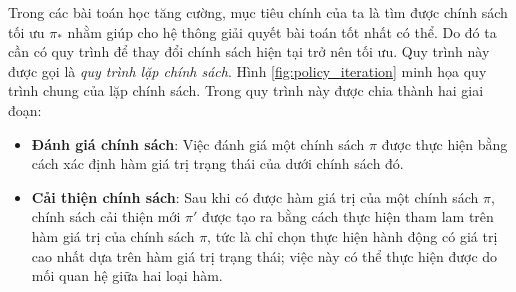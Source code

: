 	Trong các bài toán học tăng cường, mục tiêu chính của ta là tìm được chính sách tối ưu $\pi_{*}$ nhằm giúp cho hệ thông giải quyết bài toán tốt nhất có thể. Do đó ta cần có quy trình để thay đổi chính sách hiện tại trở nên tối ưu. Quy trình này được gọi là \textit{quy trình lặp chính sách}. Hình \ref{fig:policy_iteration} minh họa quy trình chung của lặp chính sách. Trong quy trình này được chia thành hai giai đoạn:
	\begin{itemize}
		\item \textbf{Đánh giá chính sách}: Việc đánh giá một chính sách $\pi$ được thực hiện bằng cách xác định hàm giá trị trạng thái của dưới chính sách đó.
		\item \textbf{Cải thiện chính sách}: Sau khi có được hàm giá trị của một chính sách $\pi$, chính sách cải thiện mới $\pi'$ được tạo ra bằng cách thực hiện tham lam trên hàm giá trị của chính sách $\pi$, tức là chỉ chọn thực hiện hành động có giá trị cao nhất dựa trên hàm giá trị trạng thái; việc này có thể thực hiện được do mối quan hệ giữa hai loại hàm. 
	\end{itemize}
